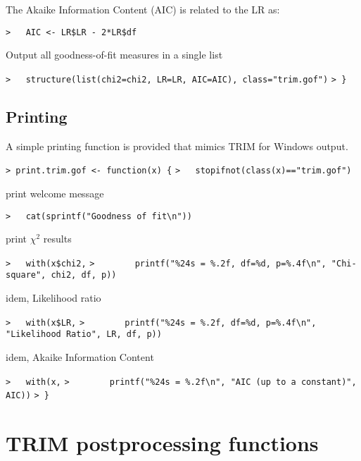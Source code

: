 \documentclass[a4paper]{article}
\begin{document}
The Akaike Information Content (AIC) is related to the LR as:\par
\verb~>   AIC <- LR$LR - 2*LR$df~\par

Output all goodness-of-fit measures in a single list\par
\verb~>   structure(list(chi2=chi2, LR=LR, AIC=AIC), class="trim.gof")~\newline
\verb~> }~\par



\subsection{Printing}\par

A simple printing function is provided that mimics TRIM for Windows output.\par

\verb~> print.trim.gof <- function(x) {~\newline
\verb~>   stopifnot(class(x)=="trim.gof")~\par
print welcome message\par
\verb~>   cat(sprintf("Goodness of fit\n"))~\par

print $\chi^2$ results\par
\verb~>   with(x$chi2,~\newline
\verb~>        printf("%24s = %.2f, df=%d, p=%.4f\n", "Chi-square", chi2, df, p))~\par

idem, Likelihood ratio\par
\verb~>   with(x$LR,~\newline
\verb~>        printf("%24s = %.2f, df=%d, p=%.4f\n", "Likelihood Ratio", LR, df, p))~\par

idem, Akaike Information Content\par
\verb~>   with(x,~\newline
\verb~>        printf("%24s = %.2f\n", "AIC (up to a constant)", AIC))~\newline
\verb~> }~\par


\section{TRIM postprocessing functions}\par
\end{document}
